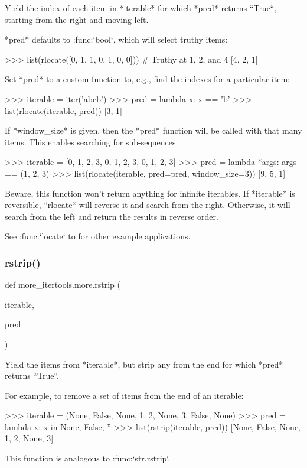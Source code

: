 \begin{DoxyVerb}Yield the index of each item in *iterable* for which *pred* returns
``True``, starting from the right and moving left.

*pred* defaults to :func:`bool`, which will select truthy items:

    >>> list(rlocate([0, 1, 1, 0, 1, 0, 0]))  # Truthy at 1, 2, and 4
    [4, 2, 1]

Set *pred* to a custom function to, e.g., find the indexes for a particular
item:

    >>> iterable = iter('abcb')
    >>> pred = lambda x: x == 'b'
    >>> list(rlocate(iterable, pred))
    [3, 1]

If *window_size* is given, then the *pred* function will be called with
that many items. This enables searching for sub-sequences:

    >>> iterable = [0, 1, 2, 3, 0, 1, 2, 3, 0, 1, 2, 3]
    >>> pred = lambda *args: args == (1, 2, 3)
    >>> list(rlocate(iterable, pred=pred, window_size=3))
    [9, 5, 1]

Beware, this function won't return anything for infinite iterables.
If *iterable* is reversible, ``rlocate`` will reverse it and search from
the right. Otherwise, it will search from the left and return the results
in reverse order.

See :func:`locate` to for other example applications.\end{DoxyVerb}
 \mbox{\label{namespacemore__itertools_1_1more_a47860d5a7bb908215bea62c2180c5655}} 
\subsubsection{\texorpdfstring{rstrip()}{rstrip()}}
{\footnotesize\ttfamily def more\+\_\+itertools.\+more.\+rstrip (\begin{DoxyParamCaption}\item[{}]{iterable,  }\item[{}]{pred }\end{DoxyParamCaption})}

\begin{DoxyVerb}Yield the items from *iterable*, but strip any from the end
for which *pred* returns ``True``.

For example, to remove a set of items from the end of an iterable:

    >>> iterable = (None, False, None, 1, 2, None, 3, False, None)
    >>> pred = lambda x: x in {None, False, ''}
    >>> list(rstrip(iterable, pred))
    [None, False, None, 1, 2, None, 3]

This function is analogous to :func:`str.rstrip`.\end{DoxyVerb}
 \mbox{\label{namespacemore__itertools_1_1more_a178dcece0d94e096739857ecdf7aee26}} 
